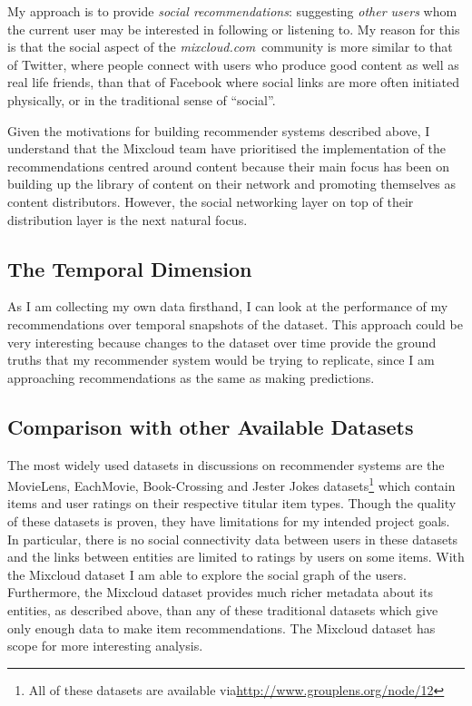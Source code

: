\documentclass[a4paper,12pt,twoside,notitlepage]{report}
\def\mixurl{\emph{mixcloud.com}}
\newcommand{\todo}[1]{\ifdraft{\textsf{\color{red} TODO: #1}}\fi}
\begin{document}
My approach is to provide \emph{social recommendations}: suggesting \emph{other
users} whom the current user may be interested in following or listening to. My
reason for this is that the social aspect of the \mixurl\ community is more
similar to that of Twitter, where people connect with users who produce good
content as well as real life friends, than that of Facebook where social links
are more often initiated physically, or in the traditional sense of ``social''.

Given the motivations for building recommender systems described above, I
understand that the Mixcloud team have prioritised the implementation of 
the recommendations centred around content because their main
focus has been on building up the library of content on their network and
promoting themselves as content distributors. However, the social networking
layer on top of their distribution layer is the next natural focus. 

\subsection{The Temporal Dimension}

As I am collecting my own data firsthand, I can look at the performance of my
recommendations over temporal snapshots of the dataset. This approach could be
very interesting because changes to the dataset over time provide the ground
truths that my recommender system would be trying to replicate, since I am
approaching recommendations as the same as making predictions.

\todo{more detail here?}

\subsection{Comparison with other Available Datasets}

The most widely used datasets in discussions on recommender systems are the 
MovieLens, EachMovie, Book-Crossing and Jester Jokes datasets\footnote{
All of these datasets are available via\url{http://www.grouplens.org/node/12}} 
which contain items and user ratings on their respective titular item types. 
Though the quality of these datasets is proven, they have limitations for my 
intended project goals. In particular, there is no social connectivity data 
between users in these datasets and the links between entities are limited to 
ratings by users on some items. With the Mixcloud dataset I am able to explore 
the social graph of the users. Furthermore, the Mixcloud dataset provides much 
richer metadata about its entities, as described above, than any of these 
traditional datasets which give only enough data to make item
recommendations. The Mixcloud dataset has scope for more interesting analysis.
\end{document}
